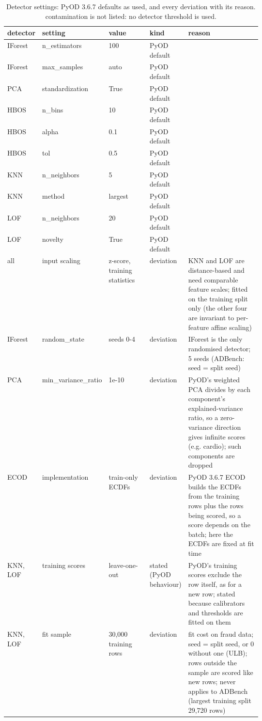 \begin{table}[t]
\centering
\footnotesize
\setlength{\tabcolsep}{4pt}
\caption{Detector settings: PyOD 3.6.7 defaults as used, and every deviation with its reason. contamination is not listed: no detector threshold is used.}
\label{tab:setup-hyperparameters}
\begin{tabular}{llp{0.17\linewidth}p{0.12\linewidth}p{0.32\linewidth}}
\toprule
detector & setting & value & kind & reason \\
\midrule
IForest & n\_estimators & 100 & PyOD default &  \\
IForest & max\_samples & auto & PyOD default &  \\
PCA & standardization & True & PyOD default &  \\
HBOS & n\_bins & 10 & PyOD default &  \\
HBOS & alpha & 0.1 & PyOD default &  \\
HBOS & tol & 0.5 & PyOD default &  \\
KNN & n\_neighbors & 5 & PyOD default &  \\
KNN & method & largest & PyOD default &  \\
LOF & n\_neighbors & 20 & PyOD default &  \\
LOF & novelty & True & PyOD default &  \\
all & input scaling & z-score, training statistics & deviation & KNN and LOF are distance-based and need comparable feature scales; fitted on the training split only (the other four are invariant to per-feature affine scaling) \\
IForest & random\_state & seeds 0-4 & deviation & IForest is the only randomised detector; 5 seeds (ADBench: seed = split seed) \\
PCA & min\_variance\_ratio & 1e-10 & deviation & PyOD's weighted PCA divides by each component's explained-variance ratio, so a zero-variance direction gives infinite scores (e.g. cardio); such components are dropped \\
ECOD & implementation & train-only ECDFs & deviation & PyOD 3.6.7 ECOD builds the ECDFs from the training rows plus the rows being scored, so a score depends on the batch; here the ECDFs are fixed at fit time \\
KNN, LOF & training scores & leave-one-out & stated (PyOD behaviour) & PyOD's training scores exclude the row itself, as for a new row; stated because calibrators and thresholds are fitted on them \\
KNN, LOF & fit sample & 30,000 training rows & deviation & fit cost on fraud data; seed = split seed, or 0 without one (ULB); rows outside the sample are scored like new rows; never applies to ADBench (largest training split 29,720 rows) \\
\bottomrule
\end{tabular}
\end{table}
